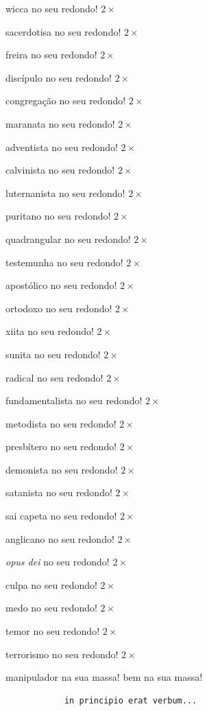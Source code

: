 \documentclass[12pt,a4paper]{article}
\begin{document}
			wicca no seu redondo! $2\times$

			sacerdotisa no seu redondo! $2\times$

			freira no seu redondo! $2\times$

			disc\'ipulo no seu redondo! $2\times$

			congrega\c{c}\~ao no seu redondo! $2\times$

			maranata no seu redondo! $2\times$

			adventista no seu redondo! $2\times$

			calvinista no seu redondo! $2\times$

			luternanista no seu redondo! $2\times$

			puritano no seu redondo! $2\times$

			quadrangular no seu redondo! $2\times$

			testemunha no seu redondo! $2\times$

			apost\'olico no seu redondo! $2\times$

			ortodoxo no seu redondo! $2\times$

			xiita no seu redondo! $2\times$

			sunita no seu redondo! $2\times$

			radical no seu redondo! $2\times$

			fundamentalista no seu redondo! $2\times$

			metodista no seu redondo! $2\times$

			presb\'itero no seu redondo! $2\times$

			demonista no seu redondo! $2\times$

			satanista no seu redondo! $2\times$

			sai capeta no seu redondo! $2\times$

			anglicano no seu redondo! $2\times$

			\emph{opus dei} no seu redondo! $2\times$

			culpa no seu redondo! $2\times$

			medo no seu redondo! $2\times$

			temor no seu redondo! $2\times$

			terrorismo no seu redondo! $2\times$

			manipulador na sua massa! bem na sua massa!

			\begin{flushright}
			\end{flushright}

			\begin{verbatim}
			in principio erat verbum...
			\end{verbatim}
\end{document}
